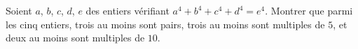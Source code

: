Soient $a$, $b$, $c$, $d$, $e$ des entiers vérifiant $a^4 + b^4 + c^4 + d^4 = e^4$. Montrer que parmi les cinq entiers, trois au moins sont pairs, trois au moins sont multiples de $5$, et deux au moins sont multiples de $10$.
